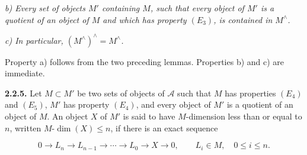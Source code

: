 \noindent\textit{b) Every set of objects $M'$ containing $M$, such that
every object of $M'$ is a quotient of an object of $M$ and which has
property $(E_3)$, is contained in $M^{\wedge}$.}

\noindent\textit{c) In particular,
$(M^{\wedge})^{\wedge}=M^{\wedge}$.}

Property a) follows from the two preceding lemmas. Properties b) and c)
are immediate.

\medskip\noindent\textbf{2.2.5.}\quad
Let $M\subset M'$ be two sets of objects of $\mathcal A$ such that $M$
has properties $(E_4)$ and $(E_5)$, $M'$ has property $(E_4)$, and every
object of $M'$ is a quotient of an object of $M$. An object $X$ of $M'$
is said to have $M$-dimension less than or equal to $n$, written
$M\text{-}\dim(X)\leq n$, if there is an exact sequence

\[
0\longrightarrow L_n\longrightarrow L_{n-1}\longrightarrow\cdots
\longrightarrow L_0\longrightarrow X\longrightarrow0,
\qquad L_i\in M,\quad0\leq i\leq n.
\]
\endgroup
